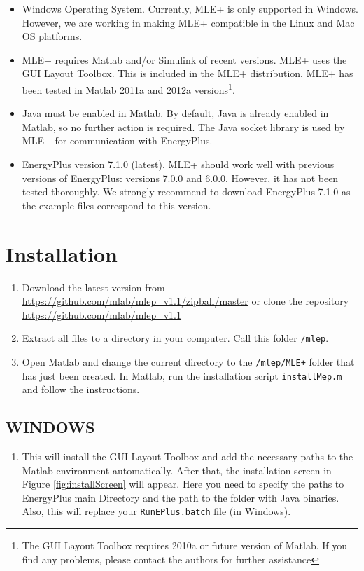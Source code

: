 \documentclass[11pt]{article}
\begin{document}
\begin{itemize}
\item Windows Operating System. Currently, MLE+ is only supported in
Windows. However, we are working in making MLE+ compatible in the
Linux and Mac OS platforms.
\item MLE+ requires Matlab and/or Simulink of recent versions.  MLE+ uses
the \href{http://www.mathworks.com/matlabcentral/fileexchange/27758}{GUI Layout Toolbox}.  This is included in the MLE+
distribution.  MLE+ has been tested in Matlab 2011a and 2012a
versions\footnote{The GUI Layout Toolbox requires 2010a or
  future version of Matlab. If you find any problems, please contact
  the authors for further assistance}.
\item Java must be enabled in Matlab. By default, Java is already enabled
in Matlab, so no further action is required.  The Java socket
library is used by MLE+ for communication with EnergyPlus.
\item EnergyPlus version 7.1.0 (latest). MLE+ should work well with
previous versions of EnergyPlus: versions 7.0.0 and 6.0.0.  However,
it has not been tested thoroughly.  We strongly recommend to
download EnergyPlus 7.1.0 as the example files correspond to this
version.
\end{itemize}


\section{Installation}
\label{sec-3}

\begin{enumerate}
\item Download the latest version from
\url{https://github.com/mlab/mlep_v1.1/zipball/master}
or clone the repository \url{https://github.com/mlab/mlep_v1.1}
\item Extract all files to a directory in your computer.  Call this folder
\texttt{/mlep}.
\item Open Matlab and change the current directory to the \texttt{/mlep/MLE+} folder
that has just been created.  In Matlab, run the installation script
\texttt{installMep.m} and follow the instructions.
\end{enumerate}

\subsection{WINDOWS}
\label{sec-3-1}

\begin{enumerate}
\item This will install the
GUI Layout Toolbox and add the necessary paths to the Matlab
environment automatically. After that, the installation screen in 
Figure \ref{fig:installScreen} will appear. Here you need to specify the 
paths to EnergyPlus main Directory and the path to the folder with 
Java binaries. Also, this will replace
your \texttt{RunEPlus.batch} file (in Windows).
\end{enumerate}
\end{document}
